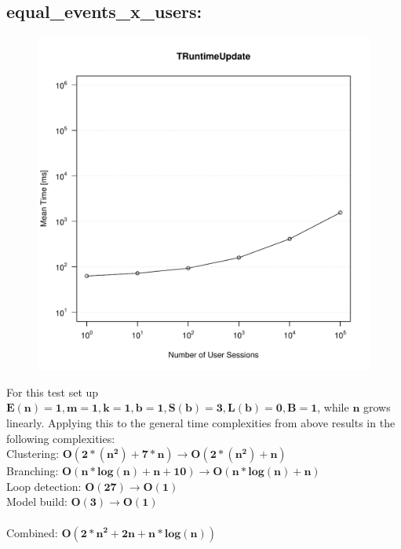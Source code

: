 \documentclass[10pt,a4paper]{article}
\begin{document}
\subsection{equal\_events\_x\_users:}
\begin{figure}[H]
	\centering
	\includegraphics[scale=0.7]{Grafiken/TRuntimeUpdate_equal_events.pdf}
\end{figure}
For this test set up $\mathbf{E(n) = 1, m = 1, k = 1, b = 1, S(b) = 3, L(b) = 0, B = 1}$, while $\mathbf{n}$ grows linearly. Applying this to the general time complexities from above results in the following complexities:\\
Clustering: $\mathbf{O(2 * (n^2) + 7 * n) \rightarrow O(2 * (n^2) + n)}$\\
Branching: $\mathbf{O(n * log(n) + n + 10) \rightarrow O(n * log(n) + n)}$\\
Loop detection: $\mathbf{O(27) \rightarrow O(1)}$\\
Model build: $\mathbf{O(3) \rightarrow O(1)}$\\
\\
Combined: $\mathbf{O(2 * n^2 + 2n + n * log(n))}$\\
\end{document}
